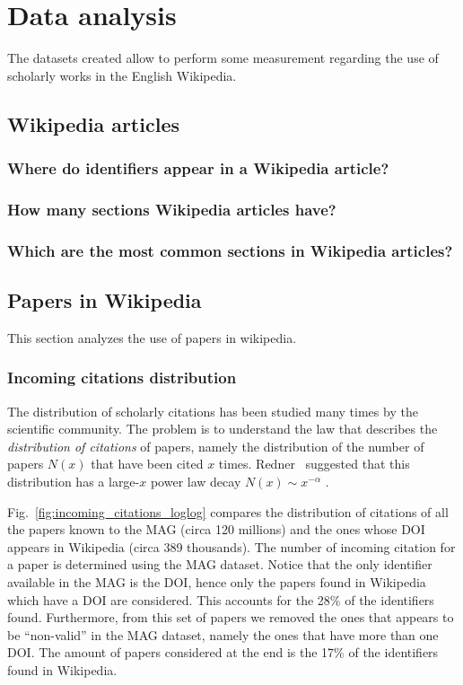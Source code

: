 
\chapter{Data analysis}
\label{cha:data_analysis}
The datasets created allow to perform some measurement regarding the use of scholarly works in the English Wikipedia.

\section{Wikipedia articles}
\subsection{Where do identifiers appear in a Wikipedia article?}

\subsection{How many sections Wikipedia articles have?}

\subsection{Which are the most common sections in Wikipedia articles?}

\section{Papers in Wikipedia}
This section analyzes the use of papers in wikipedia.

\subsection{Incoming citations distribution}
The distribution of scholarly citations has been studied many times by the scientific community.
The problem is to understand the law that describes the \emph{distribution of citations} of papers, namely the distribution of the number of papers $N(x)$ that have been cited $x$ times.
Redner~\cite{Redner1998} suggested that this distribution has a large-$x$ power law decay $N(x) \sim x^{-\alpha}$ .

Fig.~\ref{fig:incoming_citations_loglog} compares the distribution of citations of all the papers known to the MAG (circa 120 millions) and the ones whose \ac{DOI} appears in Wikipedia (circa 389 thousands).
The number of incoming citation for a paper is determined using the \ac{MAG} dataset.
Notice that the only identifier available in the \ac{MAG} is the \ac{DOI}, hence only the papers found in Wikipedia which have a \ac{DOI} are considered.
This accounts for the 28\% of the identifiers found.
Furthermore, from this set of papers we removed the ones that appears to be ``non-valid'' in the \ac{MAG} dataset, namely the ones that have more than one \ac{DOI}.
The amount of papers considered at the end is the 17\% of the identifiers found in Wikipedia.

